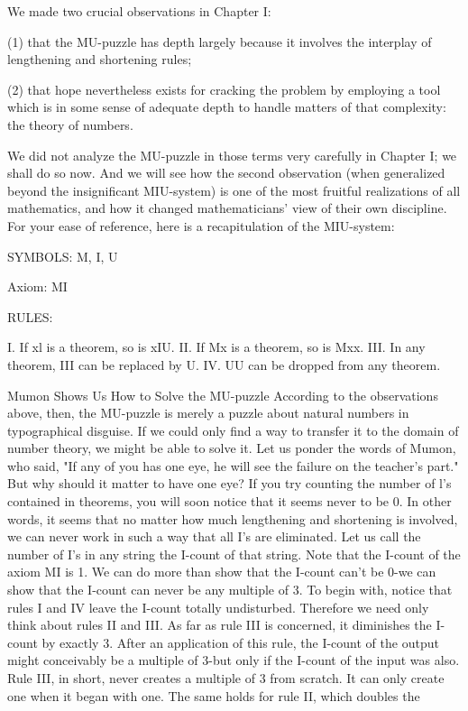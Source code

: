We made two crucial observations in Chapter I:

   (1) that the MU-puzzle has depth largely because it involves the interplay of
       lengthening and shortening rules;

   (2) that hope nevertheless exists for cracking the problem by employing a tool which
        is in some sense of adequate depth to handle matters of that complexity: the
        theory of numbers.

We did not analyze the MU-puzzle in those terms very carefully in Chapter I; we shall do
so now. And we will see how the second observation (when generalized beyond the
insignificant MIU-system) is one of the most fruitful realizations of all mathematics, and
how it changed mathematicians' view of their own discipline.
        For your ease of reference, here is a recapitulation of the MIU-system:

SYMBOLS: M, I, U

Axiom: MI

RULES:

   I. If xl is a theorem, so is xIU.
   II. If Mx is a theorem, so is Mxx.
   III. In any theorem, III can be replaced by U.
   IV. UU can be dropped from any theorem.

                Mumon Shows Us How to Solve the MU-puzzle
According to the observations above, then, the MU-puzzle is merely a puzzle about
natural numbers in typographical disguise. If we could only find a way to transfer it to the
domain of number theory, we might be able to solve it. Let us ponder the words of
Mumon, who said, "If any of you has one eye, he will see the failure on the teacher's
part." But why should it matter to have one eye?
         If you try counting the number of l's contained in theorems, you will soon notice
that it seems never to be 0. In other words, it seems that no matter how much lengthening
and shortening is involved, we can never work in such a way that all I's are eliminated.
Let us call the number of I's in any string the I-count of that string. Note that the I-count
of the axiom MI is 1. We can do more than show that the I-count can't be 0-we can show
that the I-count can never be any multiple of 3.
         To begin with, notice that rules I and IV leave the I-count totally undisturbed.
Therefore we need only think about rules II and III. As far as rule III is concerned, it
diminishes the I-count by exactly 3. After an application of this rule, the I-count of the
output might conceivably be a multiple of 3-but only if the I-count of the input was also.
Rule III, in short, never creates a multiple of 3 from scratch. It can only create one when
it began with one. The same holds for rule II, which doubles the


